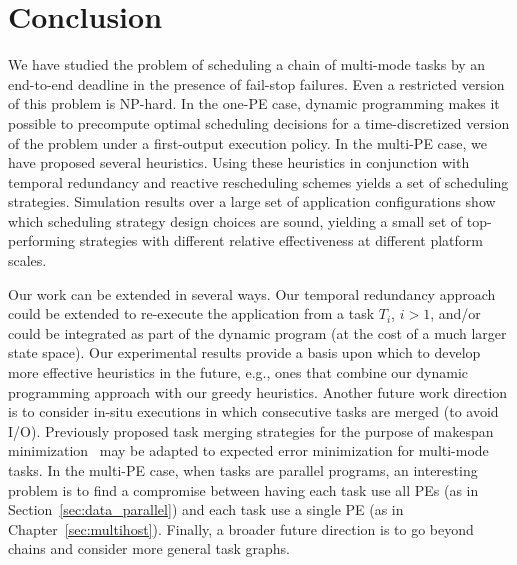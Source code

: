 \chapter{Conclusion}
\label{sec:conclusion}

We have studied the problem of scheduling a chain of multi-mode tasks by an
end-to-end deadline in the presence of fail-stop failures. Even a
restricted version of this problem is NP-hard. In the one-PE case, 
dynamic programming makes it possible to precompute optimal scheduling
decisions for a time-discretized version of the problem under a
first-output execution policy. In the multi-PE case, we have proposed
several heuristics.  Using these heuristics in conjunction with temporal
redundancy and reactive rescheduling schemes yields a set of scheduling
strategies.  Simulation results over a large set of application
configurations show which scheduling strategy design choices are sound,
yielding a small set of top-performing strategies with different relative
effectiveness at different platform scales.


Our work can be extended in several ways.  Our temporal redundancy approach
could be extended to re-execute the application from a task $T_i$, $i > 1$,
and/or could be integrated as part of the dynamic program (at the cost of a
much larger state space).  Our experimental results provide a basis upon
which to develop more effective heuristics in the future, e.g., ones that
combine our dynamic programming approach with our greedy heuristics.
Another future work direction is to consider in-situ executions in which
consecutive tasks are merged (to avoid I/O).  Previously proposed task
merging strategies for the purpose of makespan minimization~\cite{6264675}
may be adapted to expected error minimization for multi-mode tasks. In the
multi-PE case, when tasks are parallel programs, an interesting problem is
to find a compromise between having each task use all PEs (as in
Section~\ref{sec:data_parallel}) and each task use a single PE (as in
Chapter~\ref{sec:multihost}).  Finally, a broader future direction is to go
beyond chains and consider more general task graphs.
